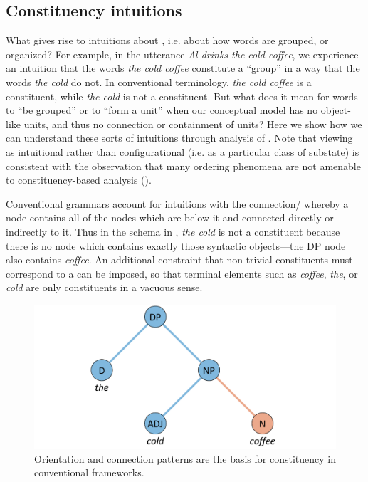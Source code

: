 \subsection{Constituency intuitions}

What gives rise to intuitions about , i.e. about how words are grouped, or organized? For example, in the utterance \textit{Al drinks the cold coffee}, we experience an intuition that the words \textit{the cold coffee} constitute a “group” in a way that the words \textit{the cold} do not. In conventional terminology, \textit{the cold coffee} is a constituent, while \textit{the cold} is not a constituent. But what does it mean for words to “be grouped” or to “form a unit” when our conceptual model has no object-like units, and thus no connection or containment of units? Here we show how we can understand these sorts of intuitions through analysis of . Note that viewing  as intuitional rather than configurational (i.e. as a particular class of substate) is consistent with the observation that many ordering phenomena are not amenable to constituency-based analysis (\citealt{Langacker1997,Phillips2003}).

  Conventional  grammars account for  intuitions with the connection/ whereby a node contains all of the nodes which are below it and connected directly or indirectly to it. Thus in the schema in {}, \textit{the cold} is not a constituent because there is no node which contains exactly those syntactic objects—the DP node also contains \textit{coffee}. An additional constraint that non-trivial constituents must correspond to a  can be imposed, so that terminal elements such as \textit{coffee}, \textit{the}, or \textit{cold} are only constituents in a vacuous sense. 

  
\begin{figure}
\includegraphics[width=\textwidth]{figures/Tilsen-img136.png}
\caption{Orientation and connection patterns are the basis for constituency in conventional frameworks.}
\label{fig:6:17}
\end{figure}
 

